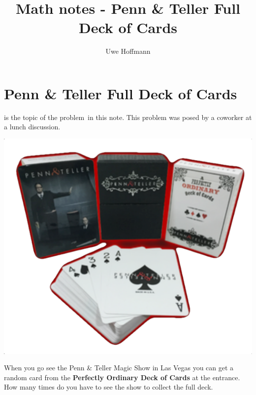 

\title{Math notes - Penn \& Teller Full Deck of Cards}
\author{Uwe Hoffmann}




\setcounter{chapter}{1}
\section*{Penn \& Teller Full Deck of Cards}

 is the topic of the problem\ in this note. This problem was posed by a coworker at a lunch discussion.

\begin{marginfigure}[0.01in]
\includegraphics[scale=0.5]{cards.pdf}
\end{marginfigure}

\vspace{10 mm}
\begin{problem}
When you go see the Penn \& Teller Magic Show in Las Vegas you can get a random card from the \textbf{Perfectly Ordinary Deck of Cards} at the entrance. How many times do you have to see the show to collect the full deck.
\end{problem}

